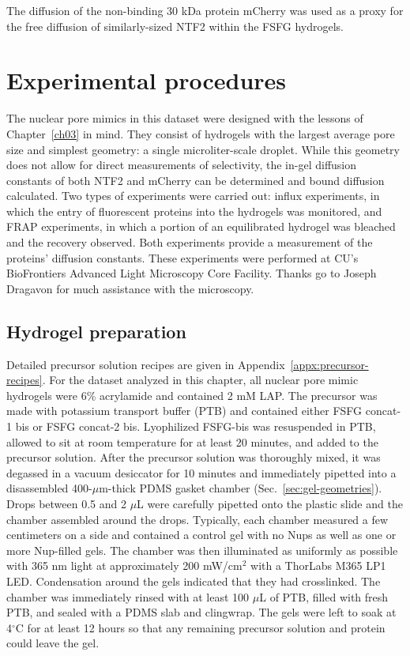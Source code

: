 The diffusion of the non-binding 30 kDa protein mCherry was used as a proxy for the free diffusion of similarly-sized NTF2 within the FSFG hydrogels.

\section{Experimental procedures}

The nuclear pore mimics in this dataset were designed with the lessons of Chapter~\ref{ch03} in mind.  They consist of hydrogels with the largest average pore size and simplest geometry: a single microliter-scale droplet.  While this geometry does not allow for direct measurements of selectivity, the in-gel diffusion constants of both NTF2 and mCherry can be determined and bound diffusion calculated.  Two types of experiments were carried out: influx experiments, in which the entry of fluorescent proteins into the hydrogels was monitored, and FRAP experiments, in which a portion of an equilibrated hydrogel was bleached and the recovery observed.  Both experiments provide a measurement of the proteins' diffusion constants.  These experiments were performed at CU's BioFrontiers Advanced Light Microscopy Core Facility.  Thanks go to Joseph Dragavon for much assistance with the microscopy.

\subsection{Hydrogel preparation}

Detailed precursor solution recipes are given in Appendix~\ref{appx:precursor-recipes}.  For the dataset analyzed in this chapter, all nuclear pore mimic hydrogels were 6\% acrylamide and contained 2 mM LAP.  The precursor was made with potassium transport buffer (PTB) and contained either FSFG concat-1 bis or FSFG concat-2 bis.  Lyophilized FSFG-bis was resuspended in PTB, allowed to sit at room temperature for at least 20 minutes, and added to the precursor solution.  After the precursor solution was thoroughly mixed, it was degassed in a vacuum desiccator for 10 minutes and immediately pipetted into a disassembled 400-$\mu$m-thick PDMS gasket chamber (Sec.~\ref{sec:gel-geometries}).  Drops between 0.5 and 2 $\mu$L were carefully pipetted onto the plastic slide and the chamber assembled around the drops.  Typically, each chamber measured a few centimeters on a side and contained a control gel with no Nups as well as one or more Nup-filled gels.  The chamber was then illuminated as uniformly as possible with 365 nm light at approximately 200 mW/cm$^2$ with a ThorLabs M365 LP1 LED.  Condensation around the gels indicated that they had crosslinked.  The chamber was immediately rinsed with at least 100 $\mu$L of PTB, filled with fresh PTB, and sealed with a PDMS slab and clingwrap.  The gels were left to soak at 4$^\circ$C for at least 12 hours so that any remaining precursor solution and protein could leave the gel.

